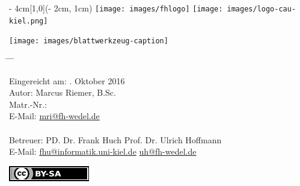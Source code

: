
\begin{titlepage}
  \vspace*{20ex}
  \begin{textblock*}{\paperwidth - 4cm}[1,0](\paperwidth - 2cm, 1cm)
    \centering
    \texttt{[image: images/fhlogo]}
    \hfill
    \texttt{[image: images/logo-cau-kiel.png]}
  \end{textblock*}
  \begin{center}
    \sffamily{}
    \texttt{[image: images/blattwerkzeug-caption]} \\[4ex]
    {\Large\docsubtitle}
  \end{center}
  \vspace*{10ex}
  \begin{tabbing}
    \hspace{8em} \= \hspace{14em} \= \hspace{8em} \= \kill

    Eingereicht am: . Oktober 2016 \\[5ex]
    Autor: \> Marcus Riemer, B.Sc. \\
    Matr.-Nr.:  \\
    E-Mail: \> \href{mailto:mri@fh-wedel.de}{mri@fh-wedel.de} \\

    \\
    Betreuer: \> PD. Dr. Frank Huch  \> Prof. Dr. Ulrich Hoffmann \\
    E-Mail: \> \href{mailto:fhu@informatik.uni-kiel.de}{fhu@informatik.uni-kiel.de} \> \href{mailto:uh@fh-wedel.de}{uh@fh-wedel.de}
  \end{tabbing}
  \vfill
  \centering \href{https://creativecommons.org/licenses/by-sa/4.0/}{\includegraphics{images/licenselogo}}
\end{titlepage}

\restoregeometry                 %

\cleardoublepage

